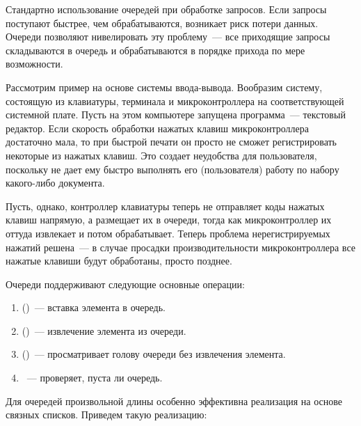 Стандартно использование очередей при обработке запросов. Если запросы поступают быстрее, чем обрабатываются, возникает риск потери данных.
Очереди позволяют нивелировать эту проблему~--- все приходящие запросы складываются в очередь и обрабатываются в порядке прихода по мере возможности.

Рассмотрим пример на основе системы ввода-вывода. Вообразим систему, состоящую из клавиатуры, терминала и микроконтроллера на соответствующей
системной плате. Пусть на этом компьютере запущена программа~--- текстовый редактор. Если скорость обработки нажатых клавиш
микроконтроллера достаточно мала, то при быстрой печати он просто не сможет регистрировать некоторые из нажатых клавиш.
Это создает неудобства для пользователя, поскольку не дает ему быстро выполнять его (пользователя) работу по набору
какого-либо документа.

Пусть, однако, контроллер клавиатуры теперь не отправляет коды нажатых клавиш напрямую, а размещает их в очереди,
тогда как микроконтроллер их оттуда извлекает и потом обрабатывает.
Теперь проблема нерегистрируемых нажатий решена~--- в случае просадки производительности микроконтроллера все
нажатые клавиши будут обработаны, просто позднее.

Очереди поддерживают следующие основные операции:
\begin{enumerate}
  \item {} ()~--- вставка элемента в очередь.
  \item {} ()~--- извлечение элемента из очереди.
  \item {} ()~--- просматривает голову очереди без извлечения элемента.
  \item {}~--- проверяет, пуста ли очередь.
\end{enumerate}

Для очередей произвольной длины особенно эффективна реализация на основе связных списков. Приведем такую реализацию:

